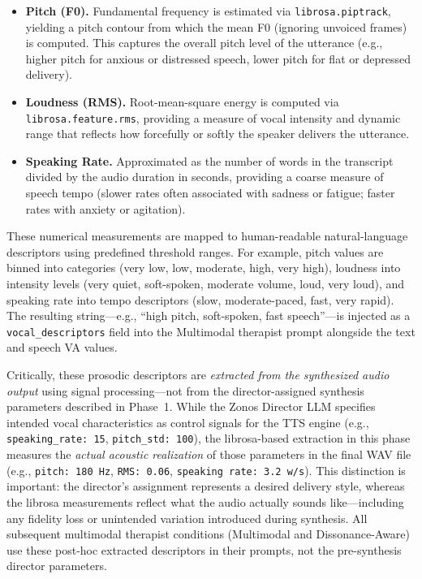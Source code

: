 \begin{itemize}
    \item \textbf{Pitch (F0).} Fundamental frequency is estimated via \texttt{librosa.piptrack}, yielding a pitch contour from which the mean F0 (ignoring unvoiced frames) is computed. This captures the overall pitch level of the utterance (e.g., higher pitch for anxious or distressed speech, lower pitch for flat or depressed delivery).

    \item \textbf{Loudness (RMS).} Root-mean-square energy is computed via \texttt{librosa.feature.rms}, providing a measure of vocal intensity and dynamic range that reflects how forcefully or softly the speaker delivers the utterance.

    \item \textbf{Speaking Rate.} Approximated as the number of words in the transcript divided by the audio duration in seconds, providing a coarse measure of speech tempo (slower rates often associated with sadness or fatigue; faster rates with anxiety or agitation).
\end{itemize}

These numerical measurements are mapped to human-readable natural-language descriptors using predefined threshold ranges. For example, pitch values are binned into categories (very low, low, moderate, high, very high), loudness into intensity levels (very quiet, soft-spoken, moderate volume, loud, very loud), and speaking rate into tempo descriptors (slow, moderate-paced, fast, very rapid). The resulting string---e.g., ``high pitch, soft-spoken, fast speech''---is injected as a \texttt{vocal\_descriptors} field into the Multimodal therapist prompt alongside the text and speech VA values.

Critically, these prosodic descriptors are \emph{extracted from the synthesized audio output} using signal processing---not from the director-assigned synthesis parameters described in Phase~1. While the Zonos Director LLM specifies intended vocal characteristics as control signals for the TTS engine (e.g., \texttt{speaking\_rate: 15}, \texttt{pitch\_std: 100}), the librosa-based extraction in this phase measures the \emph{actual acoustic realization} of those parameters in the final WAV file (e.g., \texttt{pitch: 180 Hz}, \texttt{RMS: 0.06}, \texttt{speaking rate: 3.2 w/s}). This distinction is important: the director's assignment represents a desired delivery style, whereas the librosa measurements reflect what the audio actually sounds like---including any fidelity loss or unintended variation introduced during synthesis. All subsequent multimodal therapist conditions (Multimodal and Dissonance-Aware) use these post-hoc extracted descriptors in their prompts, not the pre-synthesis director parameters.


